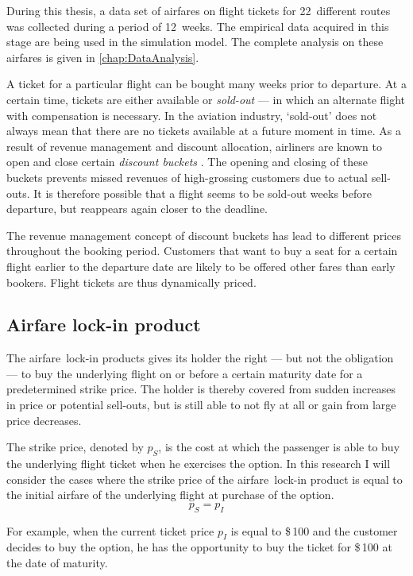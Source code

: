 During this thesis, a data set of airfares on flight tickets for 22~different routes was collected during a period of 12~weeks. The empirical data acquired in this stage are being used in the simulation model. The complete analysis on these airfares is given in \autoref{chap:DataAnalysis}.

A ticket for a particular flight can be bought many weeks prior to departure. At a certain time, tickets are either available or \emph{sold-out} --- in which an alternate flight with compensation is necessary. In the aviation industry, `sold-out' does not always mean that there are no tickets available at a future moment in time. As a result of revenue management and discount allocation, airliners are known to open and close certain \emph{discount buckets} \cite{mcgill1999revenue}. The opening and closing of these buckets prevents missed revenues of high-grossing customers due to actual sell-outs. It is therefore possible that a flight seems to be sold-out weeks before departure, but reappears again closer to the deadline.

The revenue management concept of discount buckets has lead to different prices throughout the booking period. Customers that want to buy a seat for a certain flight earlier to the departure date are likely to be offered other fares than early bookers. Flight tickets are thus dynamically priced.



\subsection{Airfare lock-in product}
The airfare~lock-in products gives its holder the right --- but not the obligation --- to buy the underlying flight on or before a certain maturity date for a predetermined strike price. The holder is thereby covered from sudden increases in price or potential sell-outs, but is still able to not fly at all or gain from large price decreases.

The strike price, denoted by $p_S$, is the cost at which the passenger is able to buy the underlying flight ticket when he exercises the option. In this research I will consider the cases where the strike price of the airfare~lock-in product is equal to the initial airfare of the underlying flight at purchase of the option.
$$p_S = p_I$$

For example, when the current ticket price $p_I$ is equal to \$\,100 and the customer decides to buy the option, he has the opportunity to buy the ticket for \$\,100 at the date of maturity.


